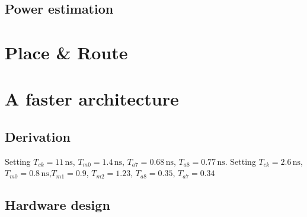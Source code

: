 \subsection{Power estimation}
\section{Place \& Route}
\section{A faster architecture}
\subsection{Derivation}
Setting $T_{ck} = 11 \,\textrm{ns}$, $T_{m0} = 1.4 \,\textrm{ns}$, $T_{a7} = 0.68 \,\textrm{ns}$, $T_{a8} = 0.77 \,\textrm{ns}$.
Setting $T_{ck} = 2.6 \,\textrm{ns}$, $T_{m0} = 0.8 \,\textrm{ns}$,$T_{m1} = 0.9$, $T_{m2} = 1.23$, $T_{a8} = 0.35$, $T_{a7}=0.34$

\subsection{Hardware design}
